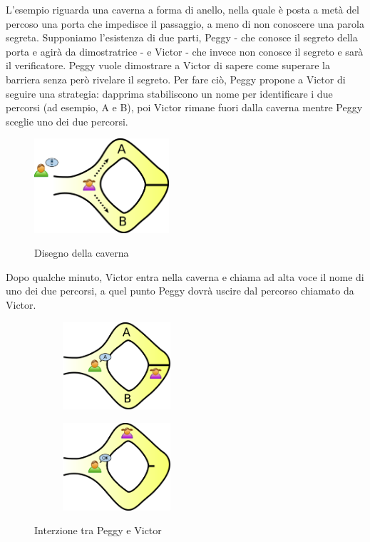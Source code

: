 L’esempio riguarda una caverna a forma di anello, nella quale è posta a metà del percoso una porta che impedisce il
passaggio, a meno di non conoscere una parola segreta. Supponiamo l'esistenza di due parti, Peggy - che
conosce il segreto della porta e agirà da dimostratrice - e Victor - che invece non conosce il segreto e sarà il
verificatore. Peggy vuole dimostrare a Victor di sapere come superare la barriera senza però rivelare il segreto. Per
fare ciò, Peggy propone a Victor di seguire una strategia: dapprima stabiliscono un nome per identificare i due percorsi
(ad esempio, A e B), poi Victor rimane fuori dalla caverna mentre Peggy sceglie uno dei due percorsi. 
\begin{figure}[H]
    \centering
    \includegraphics[width=5cm]{./chapters/1.state-of-art/images/5.1.alibaba_cave.png}
    \label{fig:alibaba-cave1}
    \captionsetup{justification=centering}
    \caption{Disegno della caverna}
\end{figure}
Dopo qualche minuto, Victor entra nella caverna e chiama ad alta voce il nome di uno dei due percorsi, a quel punto Peggy dovrà
uscire dal percorso chiamato da Victor. 
\begin{figure}
    \centering
    \begin{subfigure}{.5\textwidth}
        \centering
        \includegraphics[width=4cm]{./chapters/1.state-of-art/images/5.2.alibaba_cave.png}
        \label{fig:alibaba-cave2}
        \captionsetup{justification=centering}
    \end{subfigure}%
    \begin{subfigure}{.5\textwidth}
        \centering
        \includegraphics[width=4cm]{./chapters/1.state-of-art/images/5.3.alibaba_cave.png}
        \label{fig:alibaba-cave3}
        \captionsetup{justification=centering}
    \end{subfigure}
    \caption{Interzione tra Peggy e Victor}
    \label{fig:alibaba-cave2_3}
\end{figure}
